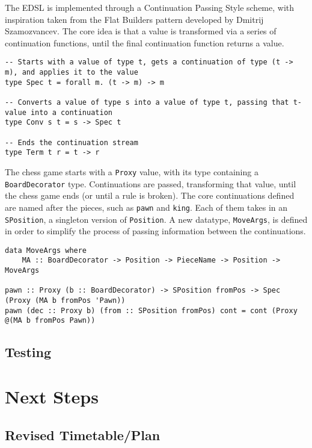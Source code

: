 \documentclass[12pt, a4paper]{scrartcl}
\begin{document}
The EDSL is implemented through a Continuation Passing Style\cite{cps} scheme, with inspiration taken from the Flat Builders pattern developed by Dmitrij Szamozvancev\cite{mezzo}. The core idea is that a value is transformed via a series of continuation functions, until the final continuation function returns a value.

\begin{lstlisting}
-- Starts with a value of type t, gets a continuation of type (t -> m), and applies it to the value
type Spec t = forall m. (t -> m) -> m

-- Converts a value of type s into a value of type t, passing that t-value into a continuation
type Conv s t = s -> Spec t

-- Ends the continuation stream
type Term t r = t -> r
\end{lstlisting}

The chess game starts with a \lstinline{Proxy} value, with its type containing a \lstinline{BoardDecorator} type. Continuations are passed, transforming that value, until the chess game ends (or until a rule is broken). The core continuations defined are named after the pieces, such as \lstinline{pawn} and \lstinline{king}. Each of them takes in an \lstinline{SPosition}, a singleton version of \lstinline{Position}. A new datatype, \lstinline{MoveArgs}, is defined in order to simplify the process of passing information between the continuations.

\begin{lstlisting}
data MoveArgs where
    MA :: BoardDecorator -> Position -> PieceName -> Position -> MoveArgs

pawn :: Proxy (b :: BoardDecorator) -> SPosition fromPos -> Spec (Proxy (MA b fromPos 'Pawn))
pawn (dec :: Proxy b) (from :: SPosition fromPos) cont = cont (Proxy @(MA b fromPos Pawn))
\end{lstlisting}

\subsection{Testing}


\section{Next Steps}


\subsection{Revised Timetable/Plan}
\end{document}
